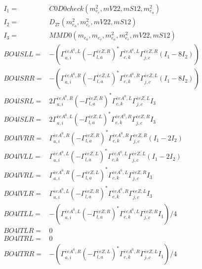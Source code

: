 \documentclass[A4,landscape]{article}
\begin{document}
\begin{align} 
I_1 = & C0D0check(m^2_{e_{{c}}}, mV22, mS12, m^2_{e_{{a}}}) \\ 
I_2 = & D_{27}(m^2_{e_{{a}}}, m^2_{e_{{c}}}, mV22, mS12) \\ 
I_3 = & MMD0(m_{e_{{a}}}, m_{e_{{c}}}, m^2_{e_{{a}}}, m^2_{e_{{c}}}, mV22, mS12) \\ 
  BO4lSLL= & -( \Gamma^{\bar{e}e A^0 ,L}_{a, i} (- \Gamma^{\bar{e}e Z ,R} _{l, a})^* \Gamma^{\bar{e}e A^0 ,L}_{c, k} \Gamma^{\bar{e}e Z ,R}_{j, c} (I_1 - 8 I_2)) \\ 
  BO4lSRR= & -( \Gamma^{\bar{e}e A^0 ,R}_{a, i} (- \Gamma^{\bar{e}e Z ,L} _{l, a})^* \Gamma^{\bar{e}e A^0 ,R}_{c, k} \Gamma^{\bar{e}e Z ,L}_{j, c} (I_1 - 8 I_2)) \\ 
  BO4lSRL= & 2  \Gamma^{\bar{e}e A^0 ,R}_{a, i} (- \Gamma^{\bar{e}e Z ,R} _{l, a})^* \Gamma^{\bar{e}e A^0 ,L}_{c, k} \Gamma^{\bar{e}e Z ,L}_{j, c} I_3 \\ 
  BO4lSLR= & 2  \Gamma^{\bar{e}e A^0 ,L}_{a, i} (- \Gamma^{\bar{e}e Z ,L} _{l, a})^* \Gamma^{\bar{e}e A^0 ,R}_{c, k} \Gamma^{\bar{e}e Z ,R}_{j, c} I_3 \\ 
  BO4lVRR= &  \Gamma^{\bar{e}e A^0 ,R}_{a, i} (- \Gamma^{\bar{e}e Z ,R} _{l, a})^* \Gamma^{\bar{e}e A^0 ,R}_{c, k} \Gamma^{\bar{e}e Z ,R}_{j, c} (I_1 - 2 I_2) \\ 
  BO4lVLL= &  \Gamma^{\bar{e}e A^0 ,L}_{a, i} (- \Gamma^{\bar{e}e Z ,L} _{l, a})^* \Gamma^{\bar{e}e A^0 ,L}_{c, k} \Gamma^{\bar{e}e Z ,L}_{j, c} (I_1 - 2 I_2) \\ 
  BO4lVRL= &  \Gamma^{\bar{e}e A^0 ,R}_{a, i} (- \Gamma^{\bar{e}e Z ,L} _{l, a})^* \Gamma^{\bar{e}e A^0 ,L}_{c, k} \Gamma^{\bar{e}e Z ,R}_{j, c} I_3 \\ 
  BO4lVLR= &  \Gamma^{\bar{e}e A^0 ,L}_{a, i} (- \Gamma^{\bar{e}e Z ,R} _{l, a})^* \Gamma^{\bar{e}e A^0 ,R}_{c, k} \Gamma^{\bar{e}e Z ,L}_{j, c} I_3 \\ 
  BO4lTLL= & -( \Gamma^{\bar{e}e A^0 ,L}_{a, i} (- \Gamma^{\bar{e}e Z ,R} _{l, a})^* \Gamma^{\bar{e}e A^0 ,L}_{c, k} \Gamma^{\bar{e}e Z ,R}_{j, c} I_1)/4 \\ 
  BO4lTLR= & 0 \\ 
  BO4lTRL= & 0 \\ 
  BO4lTRR= & -( \Gamma^{\bar{e}e A^0 ,R}_{a, i} (- \Gamma^{\bar{e}e Z ,L} _{l, a})^* \Gamma^{\bar{e}e A^0 ,R}_{c, k} \Gamma^{\bar{e}e Z ,L}_{j, c} I_1)/4 \\ 
\end{align} 
\end{document}
